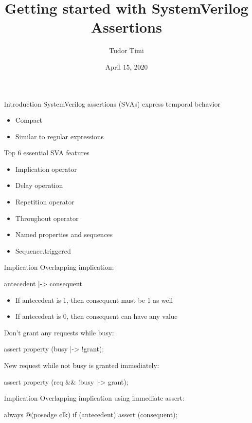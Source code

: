 \documentclass{beamer}
\title{Getting started with SystemVerilog Assertions}
\author{Tudor Timi}
\institute{VerificationGentleman.com}
\date{April 15, 2020}
\begin{document}
\begin{frame}
\titlepage
\end{frame}


\begin{frame}{Introduction}
SystemVerilog assertions (SVAs) express temporal behavior

\begin{itemize}
 \item Compact
 \item Similar to regular expressions
\end{itemize}
\end{frame}


\begin{frame}{Top 6 essential SVA features}
\begin{itemize}
 \item Implication operator
 \item Delay operation
 \item Repetition operator
 \item Throughout operator
 \item Named properties and sequences
 \item Sequence.triggered
\end{itemize}
\end{frame}


\begin{frame}{Implication}
Overlapping implication:

\begin{semiverbatim}
antecedent |-> consequent
\end{semiverbatim}

\begin{itemize}
 \item If antecedent is 1, then consequent must be 1 as well
 \item If antecedent is 0, then consequent can have any value
\end{itemize}

\pause
Don't grant any requests while busy:
\begin{semiverbatim}
assert property (busy |-> !grant);
\end{semiverbatim}

\pause
New request while not busy is granted immediately:
\begin{semiverbatim}
assert property (req \&\& !busy |-> grant);
\end{semiverbatim}
\end{frame}


\begin{frame}[fragile]{Implication}
Overlapping implication using immediate assert:

\begin{semiverbatim}
always @(posedge clk)
  if (antecedent)
    assert (consequent);
\end{semiverbatim}
\end{frame}
\end{document}
